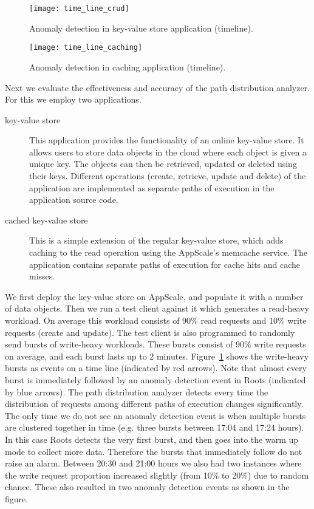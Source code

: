 \begin{figure}
\centering
\texttt{[image: time\_line\_crud]}
\caption{Anomaly detection in key-value store application (timeline).}
\label{fig:time_line_crud}
\end{figure}

\begin{figure}
\centering
\texttt{[image: time\_line\_caching]}
\caption{Anomaly detection in caching application (timeline).}
\label{fig:time_line_caching}
\end{figure}

Next we evaluate the effectiveness and accuracy of the path distribution analyzer. For this we 
employ two applications.
\begin{description}
\item[key-value store] This application provides the functionality of an online key-value store.  It allows 
users to store data objects in the cloud where each object is given a unique key. The objects can then be 
retrieved, updated or deleted using their keys. Different operations
(create, retrieve, update and delete) of the application are implemented as separate paths of
execution in the application source code.
\item[cached key-value store] This is a simple extension of the regular key-value store, which adds
caching to the read operation using the AppScale's memcache service. The application contains
separate paths of execution for cache hits and cache misses.
\end{description}

We first deploy the key-value store on AppScale, and populate it with a number of data objects. Then we
run a test client against it which generates a read-heavy workload. On average this workload
consists of 90\% read requests and 10\% write requests (create and update). The test client
is also programmed to randomly send bursts of write-heavy workloads. These bursts consist
of 90\% write requests on average, and each burst lasts up to 2 minutes. Figure~\ref{fig:time_line_crud}
shows the write-heavy bursts as events on a time line (indicated by red arrows). Note that almost every burst is
immediately followed by an anomaly detection event in Roots (indicated by blue arrows). The path
distribution analyzer detects every time the distribution of requests among different paths of execution
changes significantly. The only time we do not see an anomaly detection event is when multiple
bursts are clustered together in time (e.g. three bursts between 17:04 and 17:24 hours). In this
case Roots detects the very first burst, and then goes into the warm up mode to collect more data. Therefore
the bursts that immediately follow do not raise an alarm. Between 20:30 and 21:00 hours we also
had two instances where the write request proportion increased slightly (from 10\% to 20\%) due to random
chance. These also resulted in two anomaly detection events as shown in the figure.


